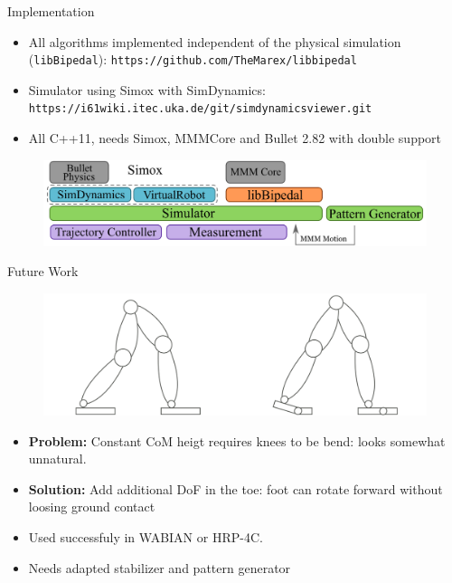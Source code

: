 \begin{frame}{Implementation}

\begin{itemize}
\item
  All algorithms implemented independent of the physical simulation
  (\texttt{libBipedal}): \texttt{https://github.com/TheMarex/libbipedal}
\item
  Simulator using Simox with SimDynamics:
  \texttt{https://i61wiki.itec.uka.de/git/simdynamicsviewer.git}
\item
  All C++11, needs Simox, MMMCore and Bullet 2.82 with double support
\end{itemize}

\begin{figure}
  \begin{center}
     \includegraphics[width=\textwidth]{images/architechture.png}
  \end{center}
\end{figure}

\end{frame}

\begin{frame}{Future Work}

\begin{figure}[b]
\includegraphics[width=\textwidth,resolution=300]{images/toes.png}
\end{figure}

\begin{itemize}
\item
  \textbf{Problem:} Constant CoM heigt requires knees to be bend: looks
  somewhat unnatural.
\item
  \textbf{Solution:} Add additional DoF in the toe: foot can rotate
  forward without loosing ground contact
\item
  Used successfuly in WABIAN or HRP-4C.
\item
  Needs adapted stabilizer and pattern generator
  \cite{kajita2012evaluation}
\end{itemize}

\end{frame}
